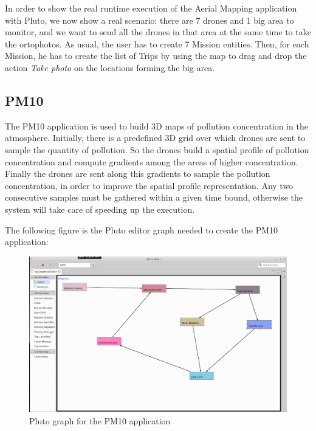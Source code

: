 In order to show the real runtime execution of the Aerial Mapping application with Pluto, we now show a real scenario:
there are 7 drones and 1 big area to monitor, and we want to send all the drones in that area at the same time to take the ortophotos.
As usual, the user has to create 7 Mission entities.
Then, for each Mission, he has to create the list of Trips by using the map to drag and drop the action \textit{Take photo} on the locations forming the big area.



\subsection{PM10}

The PM10\cite{pm10} application is used to build 3D maps of pollution concentration in the atmosphere. 
Initially, there is a predefined 3D grid over which drones are sent to sample the quantity of pollution.
So the drones build a spatial profile of pollution concentration and compute gradients among the areas of higher concentration.
Finally the drones are sent along this gradients to sample the pollution concentration, in order to improve the spatial profile representation.
Any two consecutive samples must be gathered within a given time bound, otherwise the system will take care of speeding up the execution.

The following figure is the Pluto editor graph needed to create the PM10 application:

\begin{figure}[H]
  \centering
  \includegraphics[width=\linewidth]{pictures/puttiEditor.png}
  \caption{Pluto graph for the PM10 application}
  \label{fig:pm10Graph}
\end{figure}


